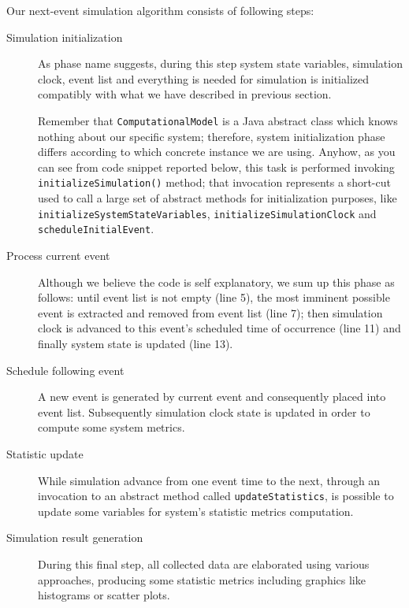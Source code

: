 \documentclass[10pt,a4paper]{article}
\begin{document}
Our next-event simulation algorithm consists of following steps: 

\begin{description}
\item[Simulation initialization] As phase name suggests, during this step system state variables, simulation clock, event list and everything is needed for simulation is initialized compatibly with what we have described in previous section.

Remember that \texttt{ComputationalModel} is a Java abstract class which knows nothing about our specific system; therefore, system initialization phase differs according to which concrete instance we are using. Anyhow, as you can see from code snippet reported below, this task is performed invoking \texttt{initialize\-Simulation()} method; that invocation represents a short-cut used to call a large set of abstract methods for initialization purposes, like \texttt{initializeSystemStateVariables}, \texttt{initializeSimulationClock} and \texttt{scheduleInitialEvent}.

\item[Process current event] Although we believe the code is self explanatory, we sum up this phase as follows: until event list is not empty (line 5), the most imminent possible event is extracted and removed from event list (line 7); then simulation clock is advanced to this event's scheduled time of occurrence (line 11) and finally system state is updated (line 13). 

\item[Schedule following event] A new event is generated by current event and consequently placed into event list. Subsequently simulation clock state is updated in order to compute some system metrics.

\item[Statistic update] While simulation advance from one event time to the next, through an invocation to an abstract method called \texttt{updateStati\-stics}, is possible to update some variables for system's statistic metrics computation.

\item[Simulation result generation] During this final step, all collected data are elaborated using various approaches, producing some statistic metrics including graphics like histograms or scatter plots.
\end{description}
\end{document}
